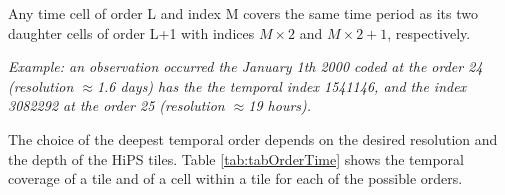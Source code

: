 \documentclass[11pt,a4paper]{ivoa}
\begin{document}
\medskip
\noindent{}
\medskip


Any time cell of order L and index M covers the same time period as its two daughter cells of order L+1 with indices $M \times 2$ and $M \times 2 +1$, respectively.

\medskip
\noindent\textit{Example:  an observation occurred the January 1th 2000 coded at the order 24 (resolution $\approx$1.6 days) has the the temporal index 1541146, and the index 3082292 at the order 25 (resolution $\approx$19 hours).}
\medskip

The choice of the deepest temporal order depends on the desired resolution and the depth of the HiPS tiles. Table \ref{tab:tabOrderTime} shows the temporal coverage of a tile and of a cell within a tile for each of the possible orders.
\end{document}
